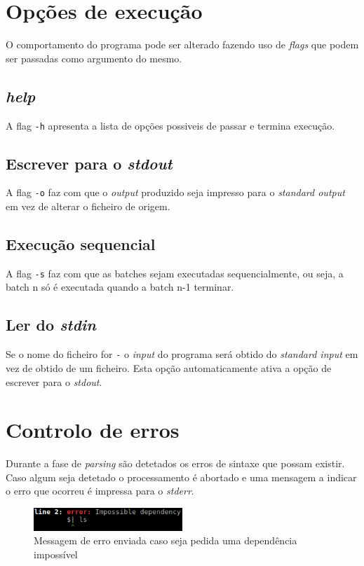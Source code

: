 \documentclass[12pt,a4paper]{report}
\begin{document}
\chapter{Opções de execução}
    O comportamento do programa pode ser alterado fazendo uso de \textit{flags}
    que podem ser passadas como argumento do mesmo.
    \section{\textit{help}}
        A flag \texttt{-h} apresenta a lista de opções possiveis
        de passar e termina execução.
    \section{Escrever para o \textit{stdout}}
        A flag \texttt{-o} faz com que o \textit{output} produzido
        seja impresso para o \textit{standard output} em vez de alterar o
        ficheiro de origem.
    \section{Execução sequencial}
        A flag \texttt{-s} faz com que as batches sejam executadas
        sequencialmente, ou seja, a batch n só é executada quando a batch n-1
        terminar.
    \section{Ler do \textit{stdin}}
        Se o nome do ficheiro for \texttt{-} o \textit{input} do
        programa será obtido do \textit{standard input} em vez de obtido de um
        ficheiro. Esta opção automaticamente ativa a opção de escrever para o
        \textit{stdout}.

\chapter{Controlo de erros}
    Durante a fase de \textit{parsing} são detetados os erros de sintaxe que
    possam existir. Caso algum seja detetado o processamento é abortado e uma
    mensagem a indicar o erro que ocorreu é impressa para o \textit{stderr}.

    \begin{figure}[h]
        \centering
        \includegraphics[width=0.5\textwidth]{./images/parseError.png}
        \caption{Messagem de erro enviada caso seja pedida uma dependência
                    impossível}
        \label{fig:parseError}
    \end{figure}
\end{document}
